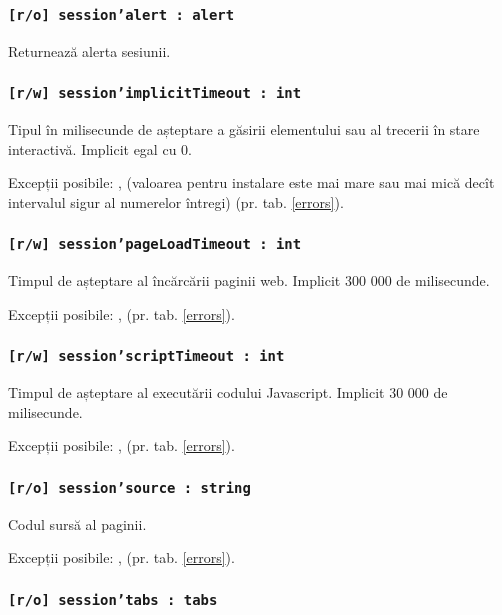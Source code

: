 \subsubsection{\texttt{[r/o] session'alert : alert}}

Returnează alerta sesiunii.

\subsubsection{\texttt{[r/w] session'implicitTimeout : int}}

Tipul în milisecunde de așteptare a găsirii elementului sau al trecerii în stare interactivă. Implicit egal cu 0.

Excepții posibile: ,  (valoarea pentru instalare este mai mare sau mai mică decît intervalul sigur al numerelor întregi) (pr. tab. \ref{errors}).

\subsubsection{\texttt{[r/w] session'pageLoadTimeout : int}}

Timpul de așteptare al încărcării paginii web. Implicit 300 000 de milisecunde.

Excepții posibile: ,  (pr. tab. \ref{errors}).

\subsubsection{\texttt{[r/w] session'scriptTimeout : int}}

Timpul de așteptare al executării codului Javascript. Implicit 30 000 de milisecunde.

Excepții posibile: ,  (pr. tab. \ref{errors}).

\subsubsection{\texttt{[r/o] session'source : string}}

Codul sursă al paginii.

Excepții posibile: ,  (pr. tab. \ref{errors}).

\subsubsection{\texttt{[r/o] session'tabs : tabs}}

